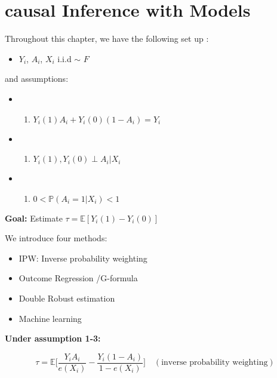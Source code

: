 \documentclass[
]{book}
\providecommand{\tightlist}{%
  \setlength{\itemsep}{0pt}\setlength{\parskip}{0pt}}
\begin{document}
\hypertarget{models}{%
\chapter{causal Inference with Models}\label{models}}

Throughout this chapter, we have the following set up :

\begin{itemize}
\tightlist
\item
  \(Y_i\), \(A_i\), \(X_i\) i.i.d \(\sim\) \(F\)
\end{itemize}

and assumptions:

\begin{itemize}
\item
  \begin{enumerate}
  \def\labelenumi{\arabic{enumi}.}
  \tightlist
  \item
    \(Y_{i}(1)A_i + Y_{i}(0)(1-A_i) = Y_i\)
  \end{enumerate}
\item
  \begin{enumerate}
  \def\labelenumi{\arabic{enumi}.}
  \setcounter{enumi}{1}
  \tightlist
  \item
    \(Y_{i}(1),Y_{i}(0) \perp A_i | X_i\)
  \end{enumerate}
\item
  \begin{enumerate}
  \def\labelenumi{\arabic{enumi}.}
  \setcounter{enumi}{2}
  \tightlist
  \item
    \(0 < \mathbb{P}(A_i = 1 | X_i) < 1\)
  \end{enumerate}
\end{itemize}

\textbf{Goal:} Estimate \(\tau = \mathbb{E}[Y_i(1) - Y_i(0)]\)

We introduce four methods:

\begin{itemize}
\tightlist
\item
  IPW: Inverse probability weighting
\item
  Outcome Regression /G-formula
\item
  Double Robust estimation
\item
  Machine learning
\end{itemize}

\textbf{Under assumption 1-3:}

\[\tau = \mathbb{E} \bigg[\frac{Y_iA_i}{e(X_i)} - \frac{Y_i(1-A_i)}{1-e(X_i)}\bigg]\,\,\,\,\,\,(\text{inverse probability weighting})\]
\end{document}

